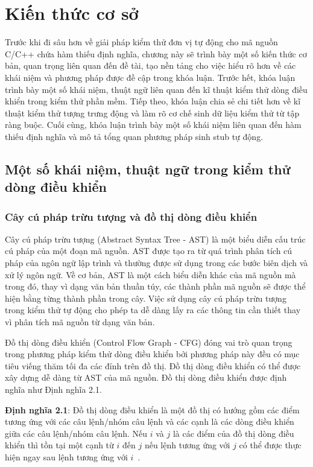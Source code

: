 \chapter{Kiến thức cơ sở}\label{chap2}
Trước khi đi sâu hơn về giải pháp kiểm thử đơn vị tự động cho mã nguồn C/C++ chứa hàm thiếu định nghĩa, chương này sẽ trình bày một số kiến thức cơ bản, quan trọng liên quan đến đề tài, tạo nền tảng cho việc hiểu rõ hơn về các khái niệm và phương pháp được đề cập trong khóa luận. Trước hết, khóa luận trình bày một số khái niệm, thuật ngữ liên quan đến kĩ thuật kiểm thử dòng điều khiển trong kiểm thử phần mềm. Tiếp theo, khóa luận chia sẻ chi tiết hơn về kĩ thuật kiểm thử tượng trưng động và làm rõ cơ chế sinh dữ liệu kiểm thử từ tập ràng buộc. Cuối cùng, khóa luận trình bày một số khái niệm liên quan đến hàm thiếu định nghĩa và mô tả tổng quan phương pháp sinh stub tự động.

\section{Một số khái niệm, thuật ngữ trong kiểm thử dòng điều khiển}
\subsection{Cây cú pháp trừu tượng và đồ thị dòng điều khiển} \label{sec:kno-ast-and-cfg}
Cây cú pháp trừu tượng (Abstract Syntax Tree - AST) là một biểu diễn cấu trúc cú pháp của một đoạn mã nguồn. AST được tạo ra từ quá trình phân tích cú pháp của ngôn ngữ lập trình và thường được sử dụng trong các bước biên dịch và xử lý ngôn ngữ. Về cơ bản, AST là một cách biểu diễn khác của mã nguồn mà trong đó, thay vì dạng văn bản thuần túy, các thành phần mã nguồn sẽ được thể hiện bằng từng thành phần trong cây. Việc sử dụng cây cú pháp trừu tượng trong kiểm thử tự động cho phép ta dễ dàng lấy ra các thông tin cần thiết thay vì phân tích mã nguồn từ dạng văn bản.
	
Đồ thị dòng điều khiển (Control Flow Graph - CFG) đóng vai trò quan trọng trong phương pháp kiểm thử dòng điều khiển bởi phương pháp này đều có mục tiêu viếng thăm tối đa các đỉnh trên đồ thị. Đồ thị dòng điều khiển có thể được xây dựng dễ dàng từ AST của mã nguồn. Đồ thị dòng điều khiển được định nghĩa như Định nghĩa 2.1.

\textbf{Định nghĩa 2.1}: Đồ thị dòng điều khiển là một đồ thị có hướng gồm các điểm tương ứng với các câu lệnh/nhóm câu lệnh và các cạnh là các dòng điều khiển giữa các câu lệnh/nhóm câu lệnh. Nếu $i$ và $j$ là các điểm của đồ thị dòng điều khiển thì tồn tại một cạnh từ $i$ đến $j$ nếu lệnh tương ứng với $j$ có thể được thực hiện ngay sau lệnh tương ứng với $i$~\cite{GiaoTrinhKiemThu}.


